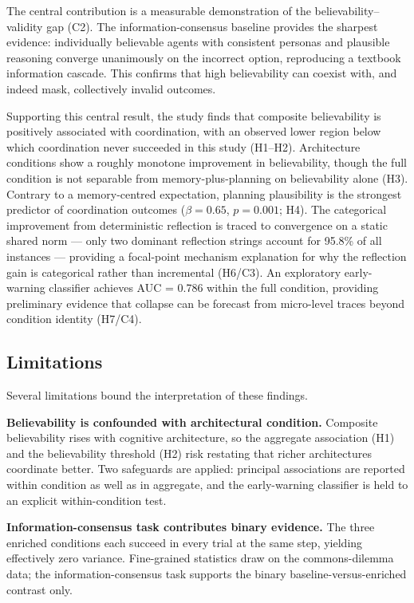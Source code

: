 \documentclass[11pt]{article}
\begin{document}
The central contribution is a measurable demonstration of the believability--validity gap (C2). The information-consensus baseline provides the sharpest evidence: individually believable agents with consistent personas and plausible reasoning converge unanimously on the incorrect option, reproducing a textbook information cascade. This confirms that high believability can coexist with, and indeed mask, collectively invalid outcomes.

Supporting this central result, the study finds that composite believability is positively associated with coordination, with an observed lower region below which coordination never succeeded in this study (H1--H2). Architecture conditions show a roughly monotone improvement in believability, though the full condition is not separable from memory-plus-planning on believability alone (H3). Contrary to a memory-centred expectation, planning plausibility is the strongest predictor of coordination outcomes ($\beta = 0.65$, $p = 0.001$; H4). The categorical improvement from deterministic reflection is traced to convergence on a static shared norm --- only two dominant reflection strings account for 95.8\% of all instances --- providing a focal-point mechanism explanation for why the reflection gain is categorical rather than incremental (H6/C3). An exploratory early-warning classifier achieves AUC = 0.786 within the full condition, providing preliminary evidence that collapse can be forecast from micro-level traces beyond condition identity (H7/C4).

\subsection{Limitations}

Several limitations bound the interpretation of these findings.

\textbf{Believability is confounded with architectural condition.} Composite believability rises with cognitive architecture, so the aggregate association (H1) and the believability threshold (H2) risk restating that richer architectures coordinate better. Two safeguards are applied: principal associations are reported within condition as well as in aggregate, and the early-warning classifier is held to an explicit within-condition test.

\textbf{Information-consensus task contributes binary evidence.} The three enriched conditions each succeed in every trial at the same step, yielding effectively zero variance. Fine-grained statistics draw on the commons-dilemma data; the information-consensus task supports the binary baseline-versus-enriched contrast only.
\end{document}
